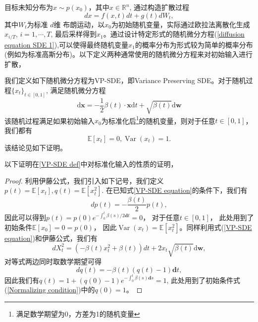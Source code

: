 目标未知分布为$x\sim p(x_0)$，其中$x\in \mathbb{R}^n$, 通过构造扩散过程
\begin{equation}
    dx = f(x,t)dt + g(t)dW_t,
    \label{diffusion equation SDE 1}
\end{equation}
其中$W_t$为标准 $d$维 布朗运动，以$x_0$为初始随机变量，实际通过欧拉法离散化生成$x_{i/T}$, $i=1,\cdots, T$, 最后采样得到$x_1$。通过设计特定形式的随机微分方程(\ref{diffusion equation SDE 1}),可以使得最终随机变量$x_1$的概率分布为形式较为简单的概率分布 (例如为标准高斯分布)。以下定义两种通常使用的随机微分方程来对初始输入进行扩散， 
\begin{definition}
\label{VP-SDE def}
    我们定义如下随机微分方程为VP-SDE，即Variance Preserving SDE。对于随机过程$\{x_t\}_{t\in [0,1]}$, 满足随机微分方程
    \begin{equation}
   \mathrm{d} \mathbf{x}=-\frac{1}{2} \beta(t) \cdot \mathbf{x} \mathrm{d} t+\sqrt{\beta(t)} \mathrm{d} \mathbf{w} \label{VP-SDE equation} 
    \end{equation}
    该随机过程满足如果初始输入$x_0$为标准化后\footnote{满足数学期望为0，方差为1的随机变量}的随机变量，则对于任意$t\in [0,1]$，我们都有
    \begin{equation}
        \mathbb{E}\left[x_t\right]=0, \operatorname{Var}\left(x_t\right)=1 .
        \label{Normalizing condition}
    \end{equation}
    该结论见如下证明。
\end{definition}
以下证明在\ref{VP-SDE def}中对标准化输入的性质的证明，
\begin{proof}
    利用伊藤公式，我们引入如下记号，我们定义$p(t) = \mathbb{E}\left[x_t\right],q(t) = \mathbb{E}\left[x_t^2\right]$. 在已知式\ref{VP-SDE equation}的条件下，我们有
    \begin{equation}
        dp(t) = -\frac{\beta(t)}{2}p(t),
    \end{equation}
    因此可以得到$p(t) = p(0)e^{-\int_{0}^t \beta(s)/2\mathbf{d}t} = 0 $， 对于任意$t\in [0,1]$， 此处用到了初始条件$\mathbb{E}\left[x_0\right]=0=p(0)$， 因此$\operatorname{Var}\left(x_t\right)=\mathbb{E}\left[x_t^2\right]$。同样利用式(\ref{VP-SDE equation})和伊藤公式，我们有
    \begin{equation}
        dX_t^2 = \left(-\beta(t)x_t^2 + \beta(t)\right)dt + 2x_t \sqrt{\beta(t)} \mathrm{d} \mathbf{w},
    \end{equation}
    对等式两边同时取数学期望可得
    \begin{equation}
        dq(t) = -\beta(t) \left(q(t)-1\right)\mathbf{d}t,
    \end{equation}
    因此我们有$q(t) = 1 + \left(q(0)-1\right)e^{-\int_{0}^t \beta(s)\mathbf{d}s}= 1$, 此处用到了初始条件式(\ref{Normalizing condition})中的$q(0)=1$。
\end{proof}

